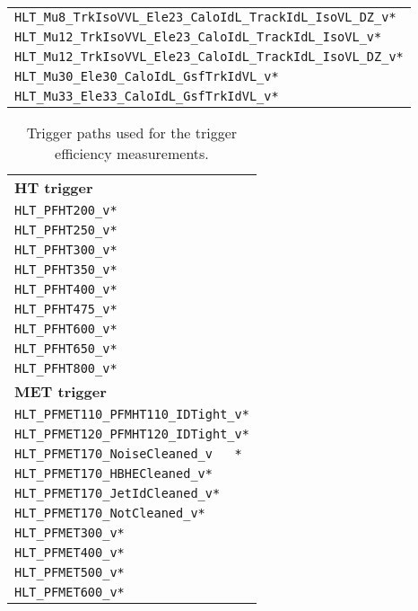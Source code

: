 \begin{table}[htb]
\begin{tabular}[width=\textwidth]{l}
  \verb|HLT_Mu8_TrkIsoVVL_Ele23_CaloIdL_TrackIdL_IsoVL_DZ_v*|                     \\
  \verb|HLT_Mu12_TrkIsoVVL_Ele23_CaloIdL_TrackIdL_IsoVL_v*|                     \\
  \verb|HLT_Mu12_TrkIsoVVL_Ele23_CaloIdL_TrackIdL_IsoVL_DZ_v*|                     \\
  \verb|HLT_Mu30_Ele30_CaloIdL_GsfTrkIdVL_v*|                     \\
  \verb|HLT_Mu33_Ele33_CaloIdL_GsfTrkIdVL_v*|                     \\
  \hline
 \end{tabular}
\end{table}




\begin{table}[htb]
 \centering
 \caption{Trigger paths used for the trigger efficiency measurements.}
 \normalsize
 \label{tab:app_trigger2}
 \begin{tabular}[width=\textwidth]{l}
  \hline
  \normalsize{\textbf{HT trigger}}  \\
  \verb|HLT_PFHT200_v*|           \\
  \verb|HLT_PFHT250_v*|           \\
  \verb|HLT_PFHT300_v*|           \\
  \verb|HLT_PFHT350_v*|           \\
  \verb|HLT_PFHT400_v*|           \\
  \verb|HLT_PFHT475_v*|           \\
  \verb|HLT_PFHT600_v*|           \\
  \verb|HLT_PFHT650_v*|           \\
  \verb|HLT_PFHT800_v*|           \\
  \normalsize{\textbf{MET trigger}} \\
  \verb|HLT_PFMET110_PFMHT110_IDTight_v*|           \\
  \verb|HLT_PFMET120_PFMHT120_IDTight_v*|           \\
  \verb|HLT_PFMET170_NoiseCleaned_v   *|           \\
  \verb|HLT_PFMET170_HBHECleaned_v*|           \\
  \verb|HLT_PFMET170_JetIdCleaned_v*|           \\
  \verb|HLT_PFMET170_NotCleaned_v*|           \\
  \verb|HLT_PFMET300_v*|           \\
  \verb|HLT_PFMET400_v*|           \\
  \verb|HLT_PFMET500_v*|           \\
  \verb|HLT_PFMET600_v*|           \\
  \hline
 \end{tabular}
\end{table}
